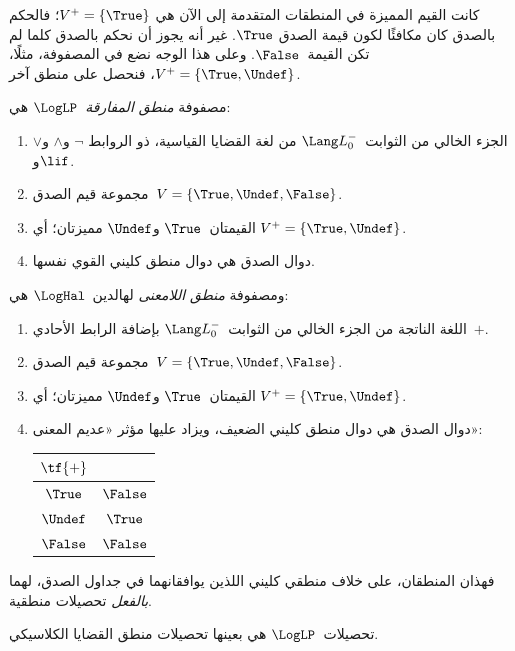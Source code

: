 \documentclass[../../../include/open-logic-section]{subfiles}
\begin{document}


كانت القيم المميزة في المنطقات المتقدمة إلى الآن هي
$V^+ = \{\True\}$؛ فالحكم بالصدق كان مكافئًا لكون قيمة الصدق
$\True$. غير أنه يجوز أن نحكم بالصدق كلما لم تكن القيمة~$\False$.
وعلى هذا الوجه نضع في المصفوفة، مثلًا،
$V^+ = \{\True, \Undef\}$، فنحصل على منطق آخر.

\begin{defn}
مصفوفة \emph{منطق المفارقة}~$\LogLP$ هي:
\begin{enumerate}
  \item الجزء الخالي من الثوابت~$\Lang L_0^{-}$ من لغة القضايا القياسية، ذو الروابط
  $\lnot$ و$\land$ و$\lor$ و$\lif$.
  \item مجموعة قيم الصدق~$V = \{\True, \Undef, \False\}$.
  \item القيمتان~$\True$ و$\Undef$ مميزتان؛ أي
  $V^+ = \{\True, \Undef\}$.
  \item دوال الصدق هي دوال منطق كليني القوي نفسها.
\end{enumerate}
\end{defn}

\begin{defn}
ومصفوفة \emph{منطق اللامعنى} لهالدين~$\LogHal$ هي:
\begin{enumerate}
  \item اللغة الناتجة من الجزء الخالي من الثوابت~$\Lang L_0^{-}$
  بإضافة الرابط الأحادي~$+$.
  \item مجموعة قيم الصدق~$V = \{\True, \Undef, \False\}$.
  \item القيمتان~$\True$ و$\Undef$ مميزتان؛ أي
  $V^+ = \{\True, \Undef\}$.
  \item دوال الصدق هي دوال منطق كليني الضعيف، ويزاد عليها مؤثر
  «عديم المعنى»:
  \begin{center}
    \begin{tabular}{c|c}
    $\tf{+}$ & \\
    \hline
    $\True$ & $\False$ \\
    $\Undef$ & $\True$ \\
    $\False$ & $\False$
    \end{tabular}
  \end{center}
\end{enumerate}
\end{defn}

فهذان المنطقان، على خلاف منطقي كليني اللذين يوافقانهما في جداول
الصدق، لهما \emph{بالفعل} تحصيلات منطقية.

\begin{prop} تحصيلات~$\LogLP$ هي بعينها
  تحصيلات منطق القضايا الكلاسيكي.
\end{prop}
\end{document}
